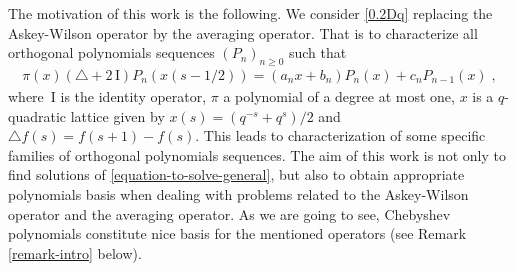 \documentclass{amsart}
\theoremstyle{remark}
\numberwithin{equation}{section}
\begin{document}
The motivation of this work is the following. We consider \eqref{0.2Dq} replacing the Askey-Wilson operator by the averaging operator. That is to characterize all orthogonal polynomials sequences $(P_n)_{n\geq 0}$ such that 
\begin{align}\label{equation-to-solve-general}
\pi(x)(\triangle +2\,\mathrm{I})P_n(x(s-1/2))=(a_n x+b_n)P_n(x)+c_n P_{n-1}(x)\;,
\end{align}
where $\,\mathrm{I}$ is the identity operator, $\pi$ a polynomial of a degree at most one, $x$ is a $q$-quadratic lattice given by $x(s)=(q^{-s}+q^s)/2$ and $\triangle f(s)=f(s+1)-f(s)$. This leads to characterization of some specific families of orthogonal polynomials sequences. The aim of this work is not only to find solutions of \eqref{equation-to-solve-general}, but also to obtain appropriate polynomials basis when dealing with problems related to the Askey-Wilson operator and the averaging operator. As we are going to see, Chebyshev polynomials constitute nice basis for the mentioned operators (see Remark \ref{remark-intro} below).

 
\end{document}
